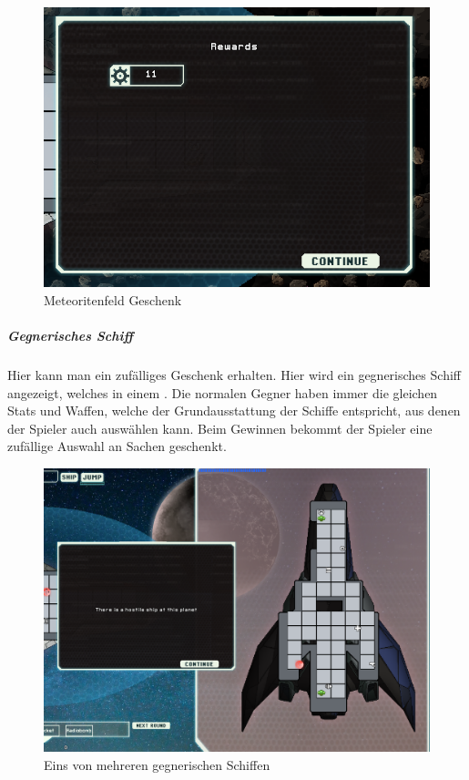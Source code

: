 \documentclass[fontsize=12pt,paper=a4,twoside]{scrartcl}
\begin{document}
\begin{figure}[H]
\centering
\includegraphics[width=1\linewidth]{DasSpiel/Karte/meteorPresent.png}
\caption{Meteoritenfeld Geschenk}
\end{figure} 



\subparagraph{Gegnerisches Schiff} Hier kann man ein zufälliges Geschenk erhalten. Hier wird ein gegnerisches Schiff angezeigt, welches in einem . Die normalen Gegner haben immer die gleichen Stats und Waffen, welche der Grundausstattung der Schiffe entspricht, aus denen der Spieler auch auswählen kann. Beim Gewinnen bekommt der Spieler eine zufällige Auswahl an Sachen geschenkt. 

\begin{figure}[H]
\centering
\includegraphics[width=1\linewidth]{DasSpiel/Karte/enemy.png}
\caption{Eins von mehreren gegnerischen Schiffen}
\end{figure} 
\end{document}

